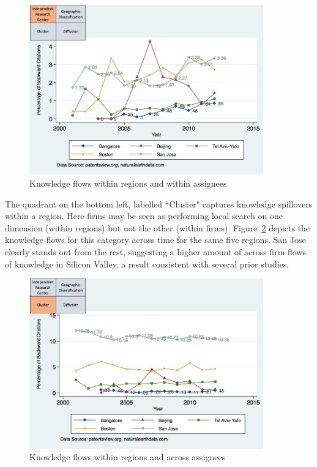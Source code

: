 \documentclass[12pt,letterpaper]{article}
\begin{document}
\begin{figure}[h]
\begin{centering}
  \caption{Knowledge flows within regions and within assignees}
  \label{fig:SMSSameRegionSameAssigneeFlows}
  \includegraphics[width=0.90\textwidth]{SMSSameRegionSameAssigneeFlows}
\end{centering}
\end{figure}


The quadrant on the bottom left, labelled ``Cluster" captures knowledge spillovers within a region. Here firms may be seen as performing local search on one dimension (within regions) but not the other (within firms). Figure~\ref{fig:SMSSameRegionDiffAssigneeFlows} depicts the knowledge flows for this category across time for the same five regions. San Jose clearly stands out from the rest, suggesting a higher amount of across firm flows of knowledge in Silicon Valley, a result consistent with several prior studies. \par

\begin{figure}[h!]
\begin{centering}
  \caption{Knowledge flows within regions and across assignees}
  \label{fig:SMSSameRegionDiffAssigneeFlows}
  \includegraphics[width=0.90\textwidth]{SMSSameRegionDiffAssigneeFlows}
\end{centering}
\end{figure}
\end{document}
